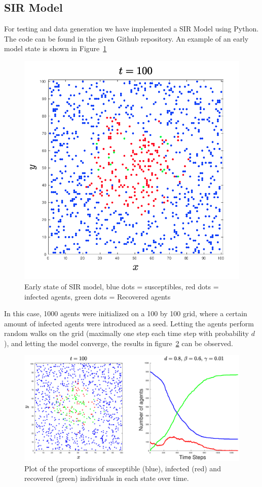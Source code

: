 \subsection{SIR Model}

For testing and data generation we have implemented a SIR Model using Python. The code can be found in the given Github repository.\newline
An example of an early model state is shown in Figure~\ref{fig:1}

\begin{figure}[H]
	\centering
	\includegraphics[width=0.4\linewidth]{initial_setup.png}
	\caption{Early state of SIR model, blue dots = susceptibles, red dots = infected agents, green dots = Recovered agents}%
	\label{fig:1}
\end{figure}

In this case, 1000 agents were initialized on a 100 by 100 grid, where a certain amount of infected agents were introduced as a seed. Letting the agents perform random walks on the grid (maximally one step each time step with probability $d$), and letting the model converge, the results in figure~\ref{fig:2} can be observed.

\begin{figure}[H]
	\centering
	\includegraphics[width=0.9\linewidth]{1_1000_agents}
	\caption{Plot of the proportions of susceptible (blue), infected (red) and recovered (green) individuals in each state over time.}%
	\label{fig:2}
\end{figure}

